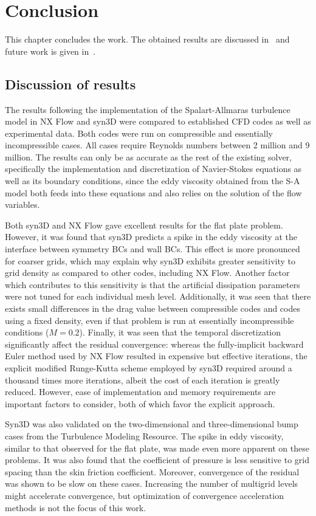 \chapter{Conclusion}
This chapter concludes the work. The obtained results are discussed in~ and future work is given in~.

\section{Discussion of results}
\label{sec:conclusionresults}
The results following the implementation of the Spalart-Allmaras turbulence model in NX Flow and syn3D were compared to established CFD codes as well as experimental data. Both codes were run on compressible and essentially incompressible cases. All cases require Reynolds numbers between 2 million and 9 million. The results can only be as accurate as the rest of the existing solver, specifically the implementation and discretization of Navier-Stokes equations as well as its boundary conditions, since the eddy viscosity obtained from the S-A model both feeds into these equations and also relies on the solution of the flow variables.

Both syn3D and NX Flow gave excellent results for the flat plate problem. However, it was found that syn3D predicts a spike in the eddy viscosity at the interface between symmetry BCs and wall BCs. This effect is more pronounced for coarser grids, which may explain why syn3D exhibits greater sensitivity to grid density as compared to other codes, including NX Flow. Another factor which contributes to this sensitivity is that the artificial dissipation parameters were not tuned for each individual mesh level. Additionally, it was seen that there exists small differences in the drag value between compressible codes and codes using a fixed density, even if that problem is run at essentially incompressible conditions ($M = 0.2$). Finally, it was seen that the temporal discretization significantly affect the residual convergence: whereas the fully-implicit backward Euler method used by NX Flow resulted in expensive but effective iterations, the explicit modified Runge-Kutta scheme employed by syn3D required around a thousand times more iterations, albeit the cost of each iteration is greatly reduced. However, ease of implementation and memory requirements are important factors to consider, both of which favor the explicit approach.

Syn3D was also validated on the two-dimensional and three-dimensional bump cases from the Turbulence Modeling Resource. The spike in eddy viscosity, similar to that observed for the flat plate, was made even more apparent on these problems. It was also found that the coefficient of pressure is less sensitive to grid spacing than the skin friction coefficient. Moreover, convergence of the residual was shown to be slow on these cases. Increasing the number of multigrid levels might accelerate convergence, but optimization of convergence acceleration methods is not the focus of this work.


